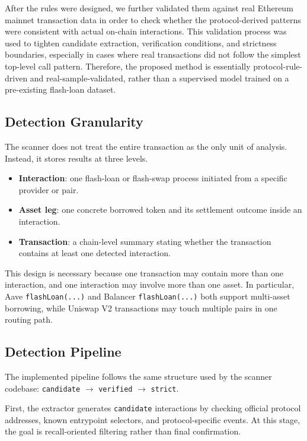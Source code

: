 After the rules were designed, we further validated them against real Ethereum mainnet transaction data in order to check whether the protocol-derived patterns were consistent with actual on-chain interactions. This validation process was used to tighten candidate extraction, verification conditions, and strictness boundaries, especially in cases where real transactions did not follow the simplest top-level call pattern. Therefore, the proposed method is essentially protocol-rule-driven and real-sample-validated, rather than a supervised model trained on a pre-existing flash-loan dataset.

\subsection{Detection Granularity}

The scanner does not treat the entire transaction as the only unit of analysis. Instead, it stores results at three levels.

\begin{itemize}[leftmargin=1.5em]
    \item \textbf{Interaction}: one flash-loan or flash-swap process initiated from a specific provider or pair.
    \item \textbf{Asset leg}: one concrete borrowed token and its settlement outcome inside an interaction.
    \item \textbf{Transaction}: a chain-level summary stating whether the transaction contains at least one detected interaction.
\end{itemize}

This design is necessary because one transaction may contain more than one interaction, and one interaction may involve more than one asset. In particular, Aave \texttt{flashLoan(...)} and Balancer \texttt{flashLoan(...)} both support multi-asset borrowing, while Uniswap V2 transactions may touch multiple pairs in one routing path.

\subsection{Detection Pipeline}

The implemented pipeline follows the same structure used by the scanner codebase: \texttt{candidate} $\rightarrow$ \texttt{verified} $\rightarrow$ \texttt{strict}.

First, the extractor generates \texttt{candidate} interactions by checking official protocol addresses, known entrypoint selectors, and protocol-specific events. At this stage, the goal is recall-oriented filtering rather than final confirmation.

